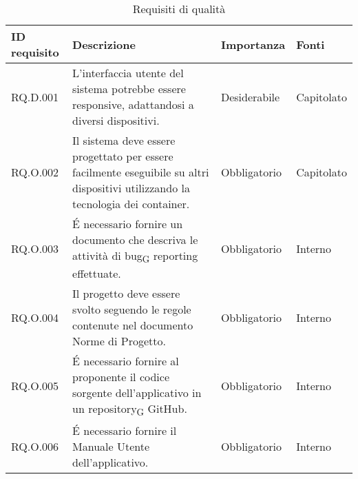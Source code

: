 \begin{table}[H]
\centering
    \begin{tabular}{|C{2.7cm}|L{7.2cm}|C{2.7cm}|C{2cm}|}
        \hline
        \textbf{ID requisito} & \textbf{Descrizione} & \textbf{Importanza} & \textbf{Fonti}  \\
        \hline
       
        \hline
        RQ.D.001 & L'interfaccia utente del sistema potrebbe essere responsive, adattandosi a diversi dispositivi. & Desiderabile & Capitolato \\
        \hline
        RQ.O.002 & Il sistema deve essere progettato per essere facilmente eseguibile su altri dispositivi utilizzando la tecnologia dei container. & Obbligatorio & Capitolato \\
        
        \hline
        RQ.O.003 & \'E necessario fornire un documento che descriva le attività di bug\textsubscript{G} reporting effettuate. & Obbligatorio & Interno \\
        \hline
        RQ.O.004 & Il progetto deve essere svolto seguendo le regole contenute nel documento Norme di Progetto. & Obbligatorio & Interno \\
        \hline
        RQ.O.005 & \'E necessario fornire al proponente il codice sorgente dell'applicativo in un
        repository\textsubscript{G} GitHub. & Obbligatorio & Interno \\
        \hline
        RQ.O.006 & \'E necessario fornire il Manuale Utente dell'applicativo. & Obbligatorio & Interno \\
        \hline
    \end{tabular}
    \caption{Requisiti di qualità}
\end{table}
